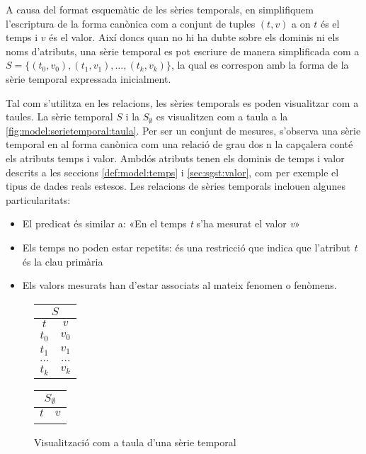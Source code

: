 A causa del format esquemàtic de les sèries temporals, en simplifiquem
l'escriptura de la forma canònica com a conjunt de tuples $(t,v)$ a on
$t$ és el temps i $v$ és el valor. Així doncs quan no hi ha dubte
sobre els dominis ni els noms d'atributs, una sèrie temporal es pot
escriure de manera simplificada com a $S = \{ (t_0,v_0), (t_1,v_1),
\dotsc, (t_k,v_k) \}$, la qual es correspon amb la forma de la sèrie
temporal expressada inicialment.


Tal com s'utilitza en les relacions, les sèries temporals es poden
visualitzar com a taules. La sèrie temporal $S$ i la $S_{\emptyset}$
es visualitzen com a taula a la
\autoref{fig:model:serietemporal:taula}.
Per ser un conjunt de mesures, s'observa una sèrie temporal en al
forma canònica com una relació de grau dos n la capçalera conté els
atributs temps i valor. Ambdós atributs tenen els dominis de temps i
valor descrits a les seccions \ref{def:model:temps} i
\ref{sec:sgst:valor}, com per exemple el tipus de dades reals
estesos. Les relacions de sèries temporals inclouen algunes
particularitats:


\begin{itemize}
\item El predicat és similar a: «En el temps \emph{t} s'ha mesurat el
  valor \emph{v}»
\item Els temps no poden estar repetits: és una restricció que indica
  que l'atribut \emph{t} és la clau primària
\item Els valors mesurats han d'estar associats al mateix fenomen o
  fenòmens.
\end{itemize}
\begin{figure}[tp]
  \centering
  \begin{tabular}[c]{|c|c|}
    \multicolumn{2}{c}{$S$} \\ \hline
    $t$  & $v$ \\ \hline
    $t_0$  & $v_0$ \\
    $t_1$  & $v_1$ \\
    $\dots$  & $\dots$ \\ 
    $t_k$  & $v_k$ \\ \hline
  \end{tabular} \qquad
  \begin{tabular}[c]{|c|c|}
    \multicolumn{2}{c}{$S_{\emptyset}$} \\ \hline
    $t$  & $v$ \\ \hline
      &  \\ \hline
  \end{tabular}
  \caption{Visualització com a taula d'una sèrie temporal}
  \label{fig:model:serietemporal:taula}
\end{figure}




